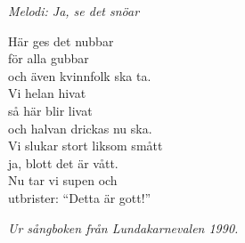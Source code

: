 {\footnotesize\textit{Melodi: Ja, se det snöar}}\par
\vspace{10pt}
Här ges det nubbar\\
för alla gubbar\\
och även kvinnfolk ska ta.\\
Vi helan hivat\\
så här blir livat\\
och halvan drickas nu ska.\\
Vi slukar stort liksom smått\\
ja, blott det är vått.\\
Nu tar vi supen och\\
utbrister: ``Detta är gott!''\par
\vspace{10pt}
{\footnotesize\textit{Ur sångboken från Lundakarnevalen 1990.}}

